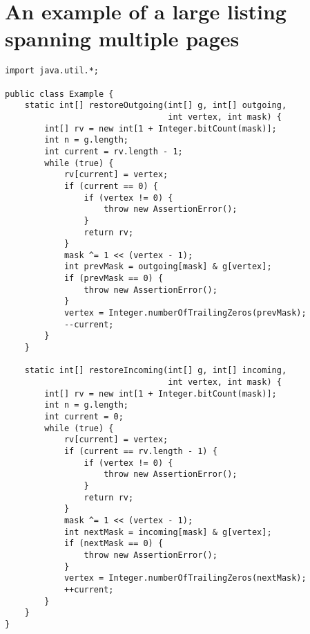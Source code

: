 \documentclass[times, %
               specification,annotation, %
               titlepage-extra-ru,specification-extra-ru,annotation-extra-ru, %
               languages={russian,english} %
              ]{itmo-student-thesis}
\begin{document}
\chapter{An example of a large listing spanning multiple pages}

\begin{lstlisting}[caption={A very big listing},label={lstX}]
import java.util.*;

public class Example {
    static int[] restoreOutgoing(int[] g, int[] outgoing,
                                 int vertex, int mask) {
        int[] rv = new int[1 + Integer.bitCount(mask)];
        int n = g.length;
        int current = rv.length - 1;
        while (true) {
            rv[current] = vertex;
            if (current == 0) {
                if (vertex != 0) {
                    throw new AssertionError();
                }
                return rv;
            }
            mask ^= 1 << (vertex - 1);
            int prevMask = outgoing[mask] & g[vertex];
            if (prevMask == 0) {
                throw new AssertionError();
            }
            vertex = Integer.numberOfTrailingZeros(prevMask);
            --current;
        }
    }

    static int[] restoreIncoming(int[] g, int[] incoming,
                                 int vertex, int mask) {
        int[] rv = new int[1 + Integer.bitCount(mask)];
        int n = g.length;
        int current = 0;
        while (true) {
            rv[current] = vertex;
            if (current == rv.length - 1) {
                if (vertex != 0) {
                    throw new AssertionError();
                }
                return rv;
            }
            mask ^= 1 << (vertex - 1);
            int nextMask = incoming[mask] & g[vertex];
            if (nextMask == 0) {
                throw new AssertionError();
            }
            vertex = Integer.numberOfTrailingZeros(nextMask);
            ++current;
        }
    }
}
\end{lstlisting}
                
\end{document}
